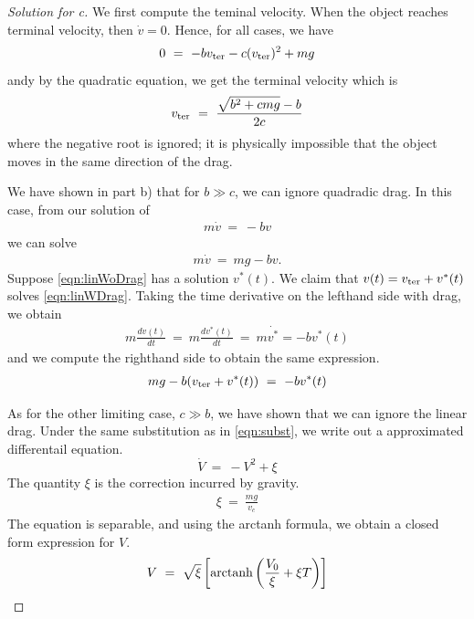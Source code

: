 \documentclass{article}
\numberwithin{equation}{section}
\begin{document}
\begin{proof}[Solution for c]
    We first compute the teminal velocity. When the object reaches 
    terminal velocity, then $\dot v = 0$. Hence, for all cases, we have 
    \begin{eqnarray}
        0 \ = \ -bv_{\rm ter} -c(v_{\rm ter})^2 + mg
    \end{eqnarray} 
    andy by the quadratic equation, we get the terminal velocity which is 
    \begin{eqnarray}
        v_{\rm ter} \ = \ \frac{
            \sqrt{b^2 + cmg} - b
        }{2c}
    \end{eqnarray}
    where the negative root is ignored; it is physically impossible 
    that the object moves in the same direction of the drag. 

    We have shown in part b) that for $b\gg c$, we can ignore quadradic drag. 
    In this case, from our solution of 
    \begin{eqnarray}\label{eqn:linWoDrag}
        m \dot v \ = \ - bv
    \end{eqnarray}
    we can solve
    \begin{align}\label{eqn:linWDrag}
        m \dot v \ = \ mg - bv.
    \end{align}
    Suppose \eqref{eqn:linWoDrag} has a solution $v^*(t)$. We claim that 
    $v(t) = v_{\rm ter} + v^*(t)$ solves \eqref{eqn:linWDrag}. 
    Taking the time derivative on the lefthand side with drag, we obtain
    \begin{eqnarray}
        m \frac {dv(t)}{dt} \ = \ m \frac {dv^*(t)}{dt} \ = \ m\dot{v^*} = -bv^*(t) 
    \end{eqnarray}
    and we compute the righthand side to obtain the same expression. 
    \begin{align}
        mg - b(v_{\rm ter}+v^*(t)) \ = \ -bv^*(t)
    \end{align}

    As for the other limiting case, $c \gg b$, we have shown that we 
    can ignore the linear drag. Under the same substitution as in \eqref{eqn:subst}, 
    we write out a approximated differentail equation. 
    \begin{equation}
        \dot V \ = \ -V^2 + \xi
    \end{equation}
    The quantity $\xi$ is the correction incurred by gravity. 
    \begin{eqnarray}
        \xi \ = \ \frac {mg}{v_c}
    \end{eqnarray}
    The equation is separable, and using the arctanh formula, 
    we obtain a closed form expression for $V$. 
    \begin{align}
        V \ = \ \sqrt{\xi} \left[\textnormal{arctanh}\left(
            \frac {V_0}{\xi} + \xi T
        \right)\right]
    \end{align}


\end{proof}
\end{document}
